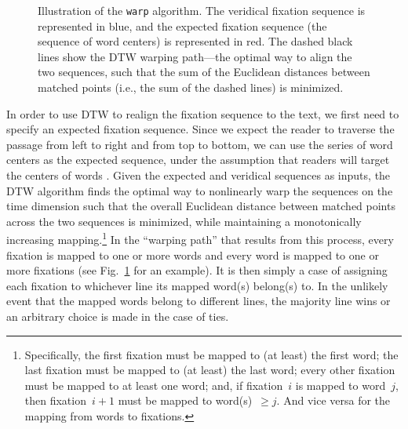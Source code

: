 \documentclass[doc,biblatex]{apa7}
\begin{document}
	\begin{figure}
	\vspace*{2pt}
	\caption{Illustration of the \texttt{warp} algorithm. The veridical fixation sequence is represented in blue, and the expected fixation sequence (the sequence of word centers) is represented in red. The dashed black lines show the DTW warping path---the optimal way to align the two sequences, such that the sum of the Euclidean distances between matched points (i.e., the sum of the dashed lines) is minimized.}
	\label{fig03}
	\end{figure}

In order to use DTW to realign the fixation sequence to the text, we first need to specify an expected fixation sequence. Since we expect the reader to traverse the passage from left to right and from top to bottom, we can use the series of word centers as the expected sequence, under the assumption that readers will target the centers of words \parencite{ORegan:1984}. Given the expected and veridical sequences as inputs, the DTW algorithm finds the optimal way to nonlinearly warp the sequences on the time dimension such that the overall Euclidean distance between matched points across the two sequences is minimized, while maintaining a monotonically increasing mapping.\footnote{Specifically, the first fixation must be mapped to (at least) the first word; the last fixation must be mapped to (at least) the last word; every other fixation must be mapped to at least one word; and, if fixation~$i$ is mapped to word~$j$, then fixation~$i+1$ must be mapped to word(s)~$\ge j$. And vice versa for the mapping from words to fixations.} In the ``warping path'' that results from this process, every fixation is mapped to one or more words and every word is mapped to one or more fixations (see Fig.~\ref{fig03} for an example). It is then simply a case of assigning each fixation to whichever line its mapped word(s) belong(s) to. In the unlikely event that the mapped words belong to different lines, the majority line wins or an arbitrary choice is made in the case of ties.
\end{document}
